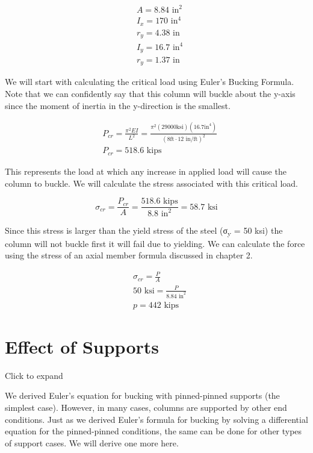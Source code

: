 \documentclass[
  letterpaper,
  DIV=11,
  numbers=noendperiod]{scrreprt}
\begin{document}
\begin{tcolorbox}
\begin{tcolorbox}
\[
\begin{aligned}
& A=8.84 \text{ in}^2 \\
& I_x=170 \text{ in}^4 \\
& r_y=4.38 \text{ in} \\
& I_y=16.7 \text{ in}^4 \\
& r_y=1.37 \text{ in}
\end{aligned}
\]

We will start with calculating the critical load using Euler's Bucking
Formula. Note that we can confidently say that this column will buckle
about the y-axis since the moment of inertia in the y-direction is the
smallest.

\[
\begin{aligned}
& P_{c r}=\frac{\pi^2 E I}{L^2}=\frac{\pi^2(29000 \mathrm{ksi})\left(16.7 \mathrm{in}^4\right)}{\left(8 \mathrm{ft} \cdot 12{\text{ in/ft}}\right)^2} \\
& P_{c r}=518.6 \text{ kips}
\end{aligned}
\]

This represents the load at which any increase in applied load will
cause the column to buckle. We will calculate the stress associated with
this critical load.

\[
\sigma_{c r}=\frac{P_{c r}}{A}=\frac{518.6 \text{ kips}}{8.8 \text{ in}^2}=58.7 \text{ ksi}
\]

Since this stress is larger than the yield stress of the steel
(σ\textsubscript{y} = 50 ksi) the column will not buckle first it will
fail due to yielding. We can calculate the force using the stress of an
axial member formula discussed in chapter 2.

\[
\begin{aligned}
&\sigma_{cr} =\frac{P}{A} \\
& 50 \text{ ksi} =\frac{P}{8.84 \text{ in}^2} \\
&p =442 \text{ kips}
\end{aligned}
\]

\end{tcolorbox}

\end{tcolorbox}

\section{Effect of Supports}\label{effect-of-supports}

Click to expand

We derived Euler's equation for bucking with pinned-pinned supports (the
simplest case). However, in many cases, columns are supported by other
end conditions. Just as we derived Euler's formula for bucking by
solving a differential equation for the pinned-pinned conditions, the
same can be done for other types of support cases. We will derive one
more here.
\end{document}
